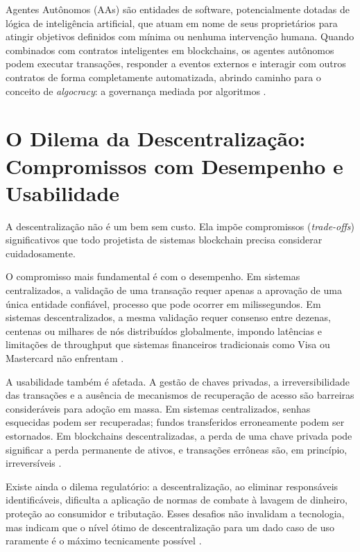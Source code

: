 \documentclass[12pt,a4paper]{report}
\begin{document}
Agentes Autônomos (AAs) são entidades de software, potencialmente dotadas de lógica de inteligência artificial, que atuam em nome de seus proprietários para atingir objetivos definidos com mínima ou nenhuma intervenção humana. Quando combinados com contratos inteligentes em blockchains, os agentes autônomos podem executar transações, responder a eventos externos e interagir com outros contratos de forma completamente automatizada, abrindo caminho para o conceito de \textit{algocracy}: a governança mediada por algoritmos \cite{Bashir2023}.

\section[O Dilema da Descentralização]{O Dilema da Descentralização: Compromissos com Desempenho e Usabilidade}

A descentralização não é um bem sem custo. Ela impõe compromissos (\textit{trade-offs}) significativos que todo projetista de sistemas blockchain precisa considerar cuidadosamente.

O compromisso mais fundamental é com o desempenho. Em sistemas centralizados, a validação de uma transação requer apenas a aprovação de uma única entidade confiável, processo que pode ocorrer em milissegundos. Em sistemas descentralizados, a mesma validação requer consenso entre dezenas, centenas ou milhares de nós distribuídos globalmente, impondo latências e limitações de throughput que sistemas financeiros tradicionais como Visa ou Mastercard não enfrentam \cite{Bashir2023}.

A usabilidade também é afetada. A gestão de chaves privadas, a irreversibilidade das transações e a ausência de mecanismos de recuperação de acesso são barreiras consideráveis para adoção em massa. Em sistemas centralizados, senhas esquecidas podem ser recuperadas; fundos transferidos erroneamente podem ser estornados. Em blockchains descentralizadas, a perda de uma chave privada pode significar a perda permanente de ativos, e transações errôneas são, em princípio, irreversíveis \cite{Bashir2023}.

Existe ainda o dilema regulatório: a descentralização, ao eliminar responsáveis identificáveis, dificulta a aplicação de normas de combate à lavagem de dinheiro, proteção ao consumidor e tributação. Esses desafios não invalidam a tecnologia, mas indicam que o nível ótimo de descentralização para um dado caso de uso raramente é o máximo tecnicamente possível \cite{Bashir2023}.
\end{document}

